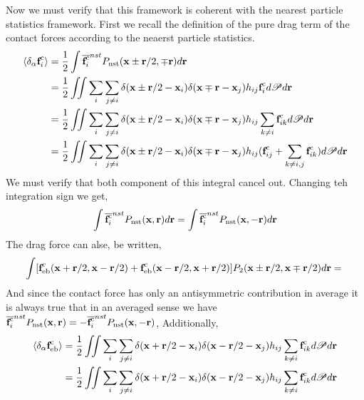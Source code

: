 Now we must verify that this framework is coherent with the nearest particle statistics framework.
First we recall the definition of the pure drag term of the contact forces according to the neaerst particle statistics. 
\begin{align*}
    \left<\delta_\alpha \textbf{f}_i^\text{c}\right>
    &= \frac{1}{2}\int \overline{\textbf{f}_i^\text{c}}^{nst} P_\text{nst}(\textbf{x}\pm\textbf{r}/2,\mp \textbf{r}) d\textbf{r}\\
    &=
    \frac{1}{2}\iint \sum_i \sum_{j\neq i}
    \delta(\textbf{x} \pm \textbf{r}/2 -\textbf{x}_i) 
    \delta(\textbf{x} \mp \textbf{r} -\textbf{x}_j) h_{ij}
    \textbf{f}_i^\text{c} 
    d\mathscr{P} d\textbf{r}\\
    &=
    \frac{1}{2}\iint \sum_i \sum_{j\neq i}
    \delta(\textbf{x} \pm \textbf{r}/2 -\textbf{x}_i)
    \delta(\textbf{x} \mp \textbf{r} -\textbf{x}_j) h_{ij}
    \sum_{k \neq i} \textbf{f}_{ik}^\text{c} 
    d\mathscr{P} d\textbf{r}\\
    &=
    \frac{1}{2}\iint \sum_i \sum_{j\neq i}
    \delta(\textbf{x} \pm \textbf{r}/2 -\textbf{x}_i)
    \delta(\textbf{x} \mp \textbf{r} -\textbf{x}_j) h_{ij}
     (\textbf{f}_{ij}^\text{c} + \sum_{k\neq i,j} \textbf{f}_{ik}^c)
    d\mathscr{P} d\textbf{r}
\end{align*}
We must verify that both component of this integral cancel out. 
Changing teh integration sign we get,
\begin{equation*}
    \int \overline{\textbf{f}_i^\text{c}}^{nst} P_\text{nst}(\textbf{x}, \textbf{r}) d\textbf{r}
    = \int \overline{\textbf{f}_i^\text{c}}^{nst} P_\text{nst}(\textbf{x}, - \textbf{r}) d\textbf{r}
\end{equation*}
The drag force can alse, be written, 
\begin{equation*}
    \int [\textbf{f}^c_\text{eb}(\textbf{x}+\textbf{r}/2,\textbf{x} - \textbf{r}/2)+ \textbf{f}_\text{eb}^c(\textbf{x} -\textbf{r}/2,\textbf{x}+ \textbf{r}/2)]P_2(\textbf{x}\pm\textbf{r}/2,\textbf{x}\mp \textbf{r}/2) d\textbf{r}
    = \\
\end{equation*}
And since the contact force has only an antisymmetric contribution in average it is always true that in an averaged sense we have $\overline{\textbf{f}_i^\text{c}}^{nst} P_\text{nst}(\textbf{x}, \textbf{r})  = - \overline{\textbf{f}_i^\text{c}}^{nst} P_\text{nst}(\textbf{x}, - \textbf{r}) $, 
Additionally, 
\begin{align*}
    \left<\delta_\alpha \textbf{f}_\text{eb}^\text{c}\right>
    &=
    \frac{1}{2}\iint \sum_i \sum_{j\neq i}
    \delta(\textbf{x} + \textbf{r}/2 -\textbf{x}_i)
    \delta(\textbf{x} - \textbf{r}/2 -\textbf{x}_j) h_{ij}
    \sum_{k \neq i} \textbf{f}_{ik}^\text{c} 
    d\mathscr{P} d\textbf{r}\\
    &=
    \frac{1}{2}\iint \sum_i \sum_{j\neq i}
    \delta(\textbf{x} + \textbf{r}/2 -\textbf{x}_i)
    \delta(\textbf{x} - \textbf{r}/2 -\textbf{x}_j) 
    h_{ij}
    \sum_{k \neq i} \textbf{f}_{ik}^\text{c} 
    d\mathscr{P} d\textbf{r}\\
\end{align*}

